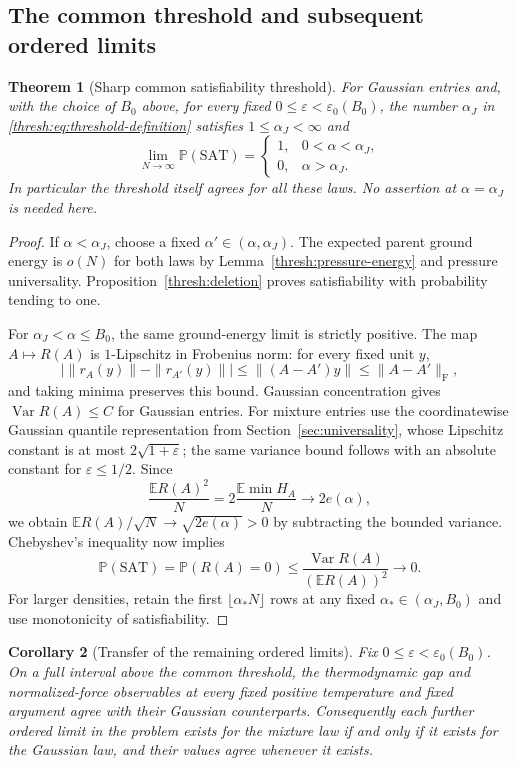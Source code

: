 \documentclass[11pt,a4paper]{article}
\numberwithin{equation}{section}
\newtheorem{theorem}{Theorem}[section]
\newtheorem{corollary}[theorem]{Corollary}
\theoremstyle{definition}
\theoremstyle{remark}
\newcommand{\E}{\mathbb E}
\newcommand{\Prob}{\mathbb P}
\newcommand{\eps}{\varepsilon}
\DeclareMathOperator{\Var}{Var}
\begin{document}
\subsection{The common threshold and subsequent ordered limits}

\begin{theorem}[Sharp common satisfiability threshold]
\label{thresh:sharp}
For Gaussian entries and, with the choice of $B_0$ above, for every
fixed $0\leq\eps<\eps_0(B_0)$, the number $\alpha_J$ in
\eqref{thresh:eq:threshold-definition} satisfies
$1\leq\alpha_J<\infty$ and
\[
 \lim_{N\to\infty}\Prob(\mathrm{SAT})=
 \begin{cases}
 1,&0<\alpha<\alpha_J,\\
 0,&\alpha>\alpha_J.
 \end{cases}
\]
In particular the threshold itself agrees for all these laws.
No assertion at $\alpha=\alpha_J$ is needed here.
\end{theorem}

\begin{proof}
If $\alpha<\alpha_J$, choose a fixed
$\alpha'\in(\alpha,\alpha_J)$.  The expected parent ground energy is
$o(N)$ for both laws by Lemma~\ref{thresh:pressure-energy} and pressure
universality.  Proposition~\ref{thresh:deletion} proves satisfiability
with probability tending to one.

For $\alpha_J<\alpha\leq B_0$, the same ground-energy limit is strictly
positive.  The map $A\mapsto R(A)$ is $1$-Lipschitz in Frobenius norm:
for every fixed unit $y$,
\[
 \bigl|\|r_A(y)\|-\|r_{A'}(y)\|\bigr|
 \leq\|(A-A')y\|\leq\|A-A'\|_{\mathrm F},
\]
and taking minima preserves this bound.  Gaussian concentration gives
$\Var R(A)\leq C$ for Gaussian entries.  For mixture entries use the
coordinatewise Gaussian quantile representation from
Section~\ref{sec:universality}, whose Lipschitz constant is at most
$2\sqrt{1+\eps}$; the same variance bound follows with an absolute
constant for $\eps\leq1/2$.  Since
\[
 \frac{\E R(A)^2}{N}=2\frac{\E\min H_A}{N}\longrightarrow2e(\alpha),
\]
we obtain
$\E R(A)/\sqrt N\to\sqrt{2e(\alpha)}>0$ by subtracting the bounded
variance.  Chebyshev's inequality now implies
\[
 \Prob(\mathrm{SAT})=\Prob(R(A)=0)
 \leq\frac{\Var R(A)}{(\E R(A))^2}\longrightarrow0.
\]
For larger densities, retain the first
$\lfloor\alpha_*N\rfloor$ rows at any fixed
$\alpha_*\in(\alpha_J,B_0)$ and use monotonicity of satisfiability.
\end{proof}

\begin{corollary}[Transfer of the remaining ordered limits]
\label{thresh:ordered-limits}
Fix $0\leq\eps<\eps_0(B_0)$.  On a full interval above the common
threshold, the thermodynamic gap and normalized-force observables at
every fixed positive temperature and fixed argument agree with their
Gaussian counterparts.  Consequently each further ordered limit in
the problem exists for the mixture law if and only if it exists for
the Gaussian law, and their values agree whenever it exists.
\end{corollary}
\end{document}

